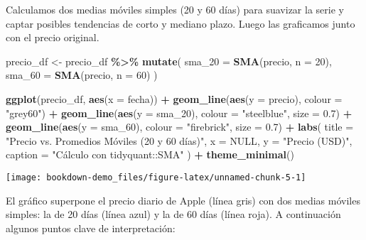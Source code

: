 \documentclass[
  11pt,
]{book}
\newenvironment{Shaded}{\begin{snugshade}}{\end{snugshade}}
\newcommand{\AttributeTok}[1]{\textcolor[rgb]{0.13,0.29,0.53}{#1}}
\newcommand{\ConstantTok}[1]{\textcolor[rgb]{0.56,0.35,0.01}{#1}}
\newcommand{\DecValTok}[1]{\textcolor[rgb]{0.00,0.00,0.81}{#1}}
\newcommand{\FloatTok}[1]{\textcolor[rgb]{0.00,0.00,0.81}{#1}}
\newcommand{\FunctionTok}[1]{\textcolor[rgb]{0.13,0.29,0.53}{\textbf{#1}}}
\newcommand{\NormalTok}[1]{#1}
\newcommand{\OtherTok}[1]{\textcolor[rgb]{0.56,0.35,0.01}{#1}}
\newcommand{\SpecialCharTok}[1]{\textcolor[rgb]{0.81,0.36,0.00}{\textbf{#1}}}
\newcommand{\StringTok}[1]{\textcolor[rgb]{0.31,0.60,0.02}{#1}}
\begin{document}
Calculamos dos medias móviles simples (20 y 60 días) para suavizar la serie y captar posibles tendencias de corto y mediano plazo. Luego las graficamos junto con el precio original.

\begin{Shaded}
\begin{Highlighting}[]
\NormalTok{precio\_df }\OtherTok{\textless{}{-}}\NormalTok{ precio\_df }\SpecialCharTok{\%\textgreater{}\%}
  \FunctionTok{mutate}\NormalTok{(}
    \AttributeTok{sma\_20 =} \FunctionTok{SMA}\NormalTok{(precio, }\AttributeTok{n =} \DecValTok{20}\NormalTok{),}
    \AttributeTok{sma\_60 =} \FunctionTok{SMA}\NormalTok{(precio, }\AttributeTok{n =} \DecValTok{60}\NormalTok{)}
\NormalTok{  )}

\FunctionTok{ggplot}\NormalTok{(precio\_df, }\FunctionTok{aes}\NormalTok{(}\AttributeTok{x =}\NormalTok{ fecha)) }\SpecialCharTok{+}
  \FunctionTok{geom\_line}\NormalTok{(}\FunctionTok{aes}\NormalTok{(}\AttributeTok{y =}\NormalTok{ precio),    }\AttributeTok{colour =} \StringTok{"grey60"}\NormalTok{) }\SpecialCharTok{+}
  \FunctionTok{geom\_line}\NormalTok{(}\FunctionTok{aes}\NormalTok{(}\AttributeTok{y =}\NormalTok{ sma\_20),    }\AttributeTok{colour =} \StringTok{"steelblue"}\NormalTok{,  }\AttributeTok{size =} \FloatTok{0.7}\NormalTok{) }\SpecialCharTok{+}
  \FunctionTok{geom\_line}\NormalTok{(}\FunctionTok{aes}\NormalTok{(}\AttributeTok{y =}\NormalTok{ sma\_60),    }\AttributeTok{colour =} \StringTok{"firebrick"}\NormalTok{,  }\AttributeTok{size =} \FloatTok{0.7}\NormalTok{) }\SpecialCharTok{+}
  \FunctionTok{labs}\NormalTok{(}
    \AttributeTok{title   =} \StringTok{"Precio vs. Promedios Móviles (20 y 60 días)"}\NormalTok{,}
    \AttributeTok{x       =} \ConstantTok{NULL}\NormalTok{,}
    \AttributeTok{y       =} \StringTok{"Precio (USD)"}\NormalTok{,}
    \AttributeTok{caption =} \StringTok{"Cálculo con tidyquant::SMA"}
\NormalTok{  ) }\SpecialCharTok{+}
  \FunctionTok{theme\_minimal}\NormalTok{()}
\end{Highlighting}
\end{Shaded}

\begin{center}\texttt{[image: bookdown-demo\_files/figure-latex/unnamed-chunk-5-1]} \end{center}

El gráfico superpone el precio diario de Apple (línea gris) con dos medias móviles simples: la de 20 días (línea azul) y la de 60 días (línea roja). A continuación algunos puntos clave de interpretación:
\end{document}
